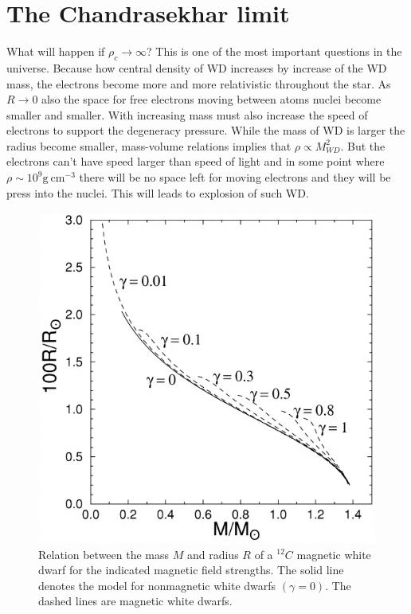 \documentclass[oneside,a4paper,11pt]{report}
\begin{document}
\section{The Chandrasekhar limit}
What will happen if $\rho_c \rightarrow \infty$? This is one of the most important questions in the universe. 
Because how central density of WD increases by increase of the WD mass, the electrons become more and more 
relativistic throughout the star. As $R\rightarrow 0 $ also the space for free electrons moving between atoms nuclei become
smaller and smaller. With increasing mass must also increase the speed of electrons to support the degeneracy pressure.  
While the mass of WD is larger the radius become smaller, mass-volume relations implies that $\rho\propto M_{WD}^2$. 
But the electrons can't have speed larger than speed of light and in some point where $\rho \sim 10^9 \mathrm{g\:cm^{-3}}$ there 
will be no space left for moving electrons and they will be press into the nuclei. This will leads to explosion of such WD. 

\begin{figure}[hbt!]
\centering
\includegraphics[totalheight=8cm]{plot/chlimit}
\caption{Relation between the mass $M$ and radius $R$ of a $^{12}C$ magnetic white dwarf for the indicated magnetic field strengths. 
The solid line denotes the \citet{1961ApJ...134..683H} model for nonmagnetic white dwarfs $(\gamma = 0)$. The dashed lines are magnetic 
white dwarfs. \citet{2000ApJ...530..949S} }
\label{Chlimit1} 
\end{figure}
\end{document}
